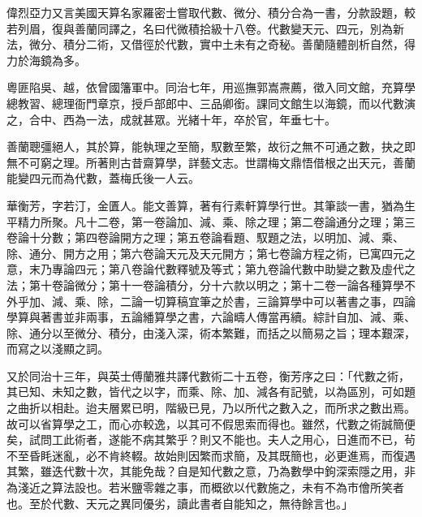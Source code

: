 \begin{pinyinscope}
偉烈亞力又言美國天算名家羅密士嘗取代數、微分、積分合為一書，分款設題，較若列眉，復與善蘭同譯之，名曰代微積拾級十八卷。代數變天元、四元，別為新法，微分、積分二術，又借徑於代數，實中土未有之奇秘。善蘭隨體剖析自然，得力於海鏡為多。

粵匪陷吳、越，依曾國籓軍中。同治七年，用巡撫郭嵩燾薦，徵入同文館，充算學總教習、總理衙門章京，授戶部郎中、三品卿銜。課同文館生以海鏡，而以代數演之，合中、西為一法，成就甚眾。光緒十年，卒於官，年垂七十。

善蘭聰彊絕人，其於算，能執理之至簡，馭數至繁，故衍之無不可通之數，抉之即無不可窮之理。所著則古昔齋算學，詳藝文志。世謂梅文鼎悟借根之出天元，善蘭能變四元而為代數，蓋梅氏後一人云。

華衡芳，字若汀，金匱人。能文善算，著有行素軒算學行世。其筆談一書，猶為生平精力所聚。凡十二卷，第一卷論加、減、乘、除之理；第二卷論通分之理；第三卷論十分數；第四卷論開方之理；第五卷論看題、馭題之法，以明加、減、乘、除、通分、開方之用；第六卷論天元及天元開方；第七卷論方程之術，已寓四元之意，末乃專論四元；第八卷論代數釋號及等式；第九卷論代數中助變之數及虛代之法；第十卷論微分；第十一卷論積分，分十六款以明之；第十二卷一論各種算學不外乎加、減、乘、除，二論一切算稿宜筆之於書，三論算學中可以著書之事，四論學算與著書並非兩事，五論繙算學之書，六論疇人傳當再續。綜計自加、減、乘、除、通分以至微分、積分，由淺入深，術本繁難，而括之以簡易之旨；理本艱深，而寫之以淺顯之詞。

又於同治十三年，與英士傅蘭雅共譯代數術二十五卷，衡芳序之曰：「代數之術，其已知、未知之數，皆代之以字，而乘、除、加、減各有記號，以為區別，可如題之曲折以相赴。迨夫層累已明，階級已見，乃以所代之數入之，而所求之數出焉。故可以省算學之工，而心亦較逸，以其可不假思索而得也。雖然，代數之術誠簡便矣，試問工此術者，遂能不病其繁乎？則又不能也。夫人之用心，日進而不已，茍不至昏眊迷亂，必不肯終輟。故始則因繁而求簡，及其既簡也，必更進焉，而復遇其繁，雖迭代數十次，其能免哉？自是知代數之意，乃為數學中鉤深索隱之用，非為淺近之算法設也。若米鹽零雜之事，而概欲以代數施之，未有不為市儈所笑者也。至於代數、天元之異同優劣，讀此書者自能知之，無待餘言也。」


\end{pinyinscope}
